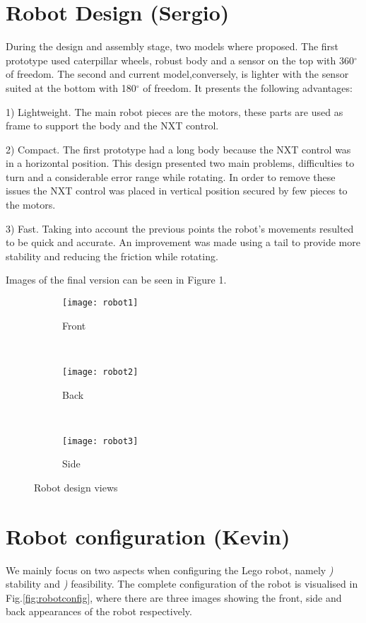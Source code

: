 \section{Robot Design (Sergio)}

During the design and assembly stage, two models where proposed. The first prototype used caterpillar wheels, robust body and a sensor on the top with 360$^{\circ}$ of freedom. The second and current model,conversely, is lighter with the sensor suited at the bottom with 180$^{\circ}$ of freedom. It presents the following advantages: 

1) Lightweight. The main robot pieces are the motors, these parts are used as frame to support the body and the NXT control.


2) Compact. The first prototype had a long body because the NXT control was in a horizontal position. This design presented two main problems, difficulties to turn and a considerable error range while rotating. In order to remove these issues the NXT control was placed in vertical position secured by few pieces to the motors.

3) Fast. Taking into account the previous points the robot's movements resulted to be quick and accurate. An improvement was made using a tail to provide more stability and reducing the friction while rotating. 

Images of the final version can be seen in Figure 1.


\begin{figure}[h!]
	\centering
	\begin{subfigure}[b]{0.3\textwidth}
		\texttt{[image: robot1]}
		\caption{Front}
		\label{fig:front}
	\end{subfigure}
	~ %
	\begin{subfigure}[b]{0.3\textwidth}
		\texttt{[image: robot2]}
		\caption{Back}
		\label{fig:back}
	\end{subfigure}
	~ 
	\begin{subfigure}[b]{0.3\textwidth}
		\texttt{[image: robot3]}
		\caption{Side}
		\label{fig:side}
	\end{subfigure}
	\caption{Robot design views}\label{fig:robot}
\end{figure}


\FloatBarrier


\section{Robot configuration (Kevin)}
We mainly focus on two aspects when configuring the Lego robot, namely {\itshape {})} stability and {\itshape {})} feasibility. The complete configuration of the robot is visualised in Fig.\ref{fig:robotconfig}, where there are three images showing the front, side and back appearances of the robot respectively. 

